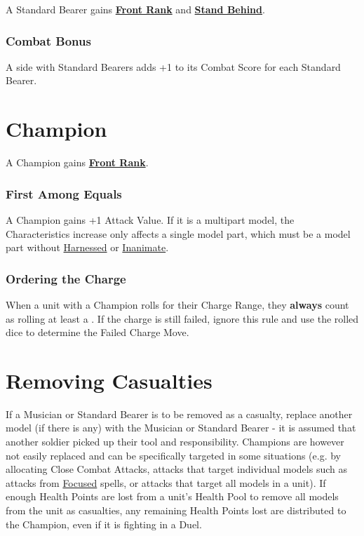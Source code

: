 A Standard Bearer gains \hyperref[front_rank]{\textbf{Front Rank}} and \hyperref[stand_behind]{\textbf{Stand Behind}}.

\subsubsection{Combat Bonus}

A side with Standard Bearers adds +1 to its Combat Score for each Standard Bearer.

\section{Champion}
\label{champion}

A Champion gains \hyperref[front_rank]{\textbf{Front Rank}}.

\subsubsection{First Among Equals}
\label{first_among_equals}

A Champion gains +1 Attack Value. If it is a multipart model, the Characteristics increase only affects a single model part, which must be a model part without \hyperref[harnessed]{Harnessed} or \hyperref[inanimate]{Inanimate}.

\subsubsection{Ordering the Charge}
\label{ordering_the_charge}

When a unit with a Champion rolls for their Charge Range, they \textbf{always} count as rolling at least a . If the charge is still failed, ignore this rule and use the rolled dice to determine the Failed Charge Move.

\section{Removing Casualties}

If a Musician or Standard Bearer is to be removed as a casualty, replace another \rnf{} model (if there is any) with the Musician or Standard Bearer - it is assumed that another soldier picked up their tool and responsibility. Champions are however not easily replaced and can be specifically targeted in some situations (e.g. by allocating Close Combat Attacks, attacks that target individual models such as attacks from \hyperref[focused]{Focused} spells, or attacks that target all models in a unit). If enough Health Points are lost from a unit's Health Pool to remove all \rnf{} models from the unit as casualties, any remaining Health Points lost are distributed to the Champion, even if it is fighting in a Duel.
